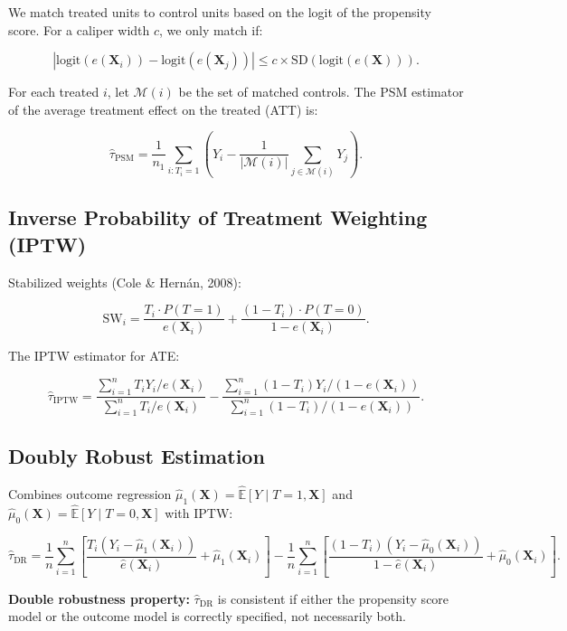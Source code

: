 \documentclass[12pt]{article}
\begin{document}
	We match treated units to control units based on the logit of the propensity score. For a caliper width $c$, we only match if:
	
	\[
	|\text{logit}(e(\mathbf{X}_i)) - \text{logit}(e(\mathbf{X}_j))| \le c \times \text{SD}(\text{logit}(e(\mathbf{X}))).
	\]
	
	For each treated $i$, let $\mathcal{M}(i)$ be the set of matched controls. The PSM estimator of the average treatment effect on the treated (ATT) is:
	
	\[
	\hat{\tau}_{\text{PSM}} = \frac{1}{n_1} \sum_{i: T_i=1} \left( Y_i - \frac{1}{|\mathcal{M}(i)|} \sum_{j \in \mathcal{M}(i)} Y_j \right).
	\]
	
	\subsection{Inverse Probability of Treatment Weighting (IPTW)}
	
	Stabilized weights (Cole \& Hernán, 2008):
	
	\[
	\text{SW}_i = \frac{T_i \cdot P(T=1)}{e(\mathbf{X}_i)} + \frac{(1-T_i) \cdot P(T=0)}{1 - e(\mathbf{X}_i)}.
	\]
	
	The IPTW estimator for ATE:
	
	\[
	\hat{\tau}_{\text{IPTW}} = \frac{\sum_{i=1}^n T_i Y_i / e(\mathbf{X}_i)}{\sum_{i=1}^n T_i / e(\mathbf{X}_i)} - \frac{\sum_{i=1}^n (1-T_i) Y_i / (1-e(\mathbf{X}_i))}{\sum_{i=1}^n (1-T_i) / (1-e(\mathbf{X}_i))}.
	\]
	
	\subsection{Doubly Robust Estimation}
	
	Combines outcome regression $\hat{\mu}_1(\mathbf{X}) = \hat{\mathbb{E}}[Y\mid T=1,\mathbf{X}]$ and $\hat{\mu}_0(\mathbf{X}) = \hat{\mathbb{E}}[Y\mid T=0,\mathbf{X}]$ with IPTW:
	
	\[
	\hat{\tau}_{\text{DR}} = \frac{1}{n} \sum_{i=1}^n \left[ \frac{T_i (Y_i - \hat{\mu}_1(\mathbf{X}_i))}{\hat{e}(\mathbf{X}_i)} + \hat{\mu}_1(\mathbf{X}_i) \right] - \frac{1}{n} \sum_{i=1}^n \left[ \frac{(1-T_i)(Y_i - \hat{\mu}_0(\mathbf{X}_i))}{1 - \hat{e}(\mathbf{X}_i)} + \hat{\mu}_0(\mathbf{X}_i) \right].
	\]
	
	\textbf{Double robustness property:} $\hat{\tau}_{\text{DR}}$ is consistent if either the propensity score model or the outcome model is correctly specified, not necessarily both.
	
\end{document}

